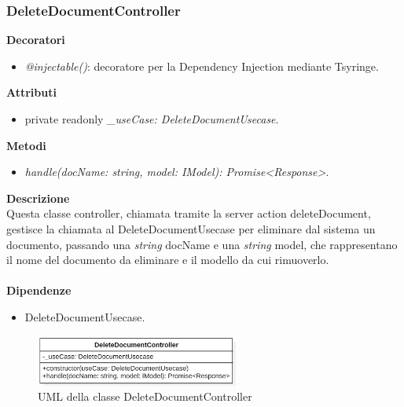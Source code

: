 \subsubsection{DeleteDocumentController}
\textbf{Decoratori}
\begin{itemize}
    \item \textit{@injectable()}: decoratore per la Dependency Injection mediante Tsyringe.
\end{itemize}
\textbf{Attributi}
\begin{itemize}
    \item private readonly \textit{\_useCase: DeleteDocumentUsecase}.
\end{itemize}
\textbf{Metodi}
\begin{itemize}
    \item \textit{handle(docName: string, model: IModel): Promise<Response>}.
\end{itemize}
\textbf{Descrizione}\\
Questa classe controller, chiamata tramite la server action deleteDocument, gestisce la chiamata al DeleteDocumentUsecase per eliminare dal sistema un documento, passando una \textit{string} docName e una \textit{string} model, che rappresentano il nome del documento da eliminare e il modello da cui rimuoverlo.\\ \\
\textbf{Dipendenze}
\begin{itemize}
    \item DeleteDocumentUsecase.
\end{itemize}

\begin{figure}[h!]
    \centering  
    \includegraphics[width=0.6\textwidth]{DeleteDocumentController.png}
    \caption{UML della classe DeleteDocumentController}
\end{figure}

